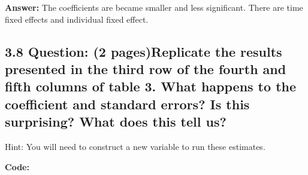 \documentclass[
]{article}
\begin{document}
\textbf{Answer:} The coefficients are became smaller and less
significant. There are time fixed effects and individual fixed effect.

\clearpage

\hypertarget{question-2-pagesreplicate-the-results-presented-in-the-third-row-of-the-fourth-and-fifth-columns-of-table-3.-what-happens-to-the-coefficient-and-standard-errors-is-this-surprising-what-does-this-tell-us}{%
\subsection{\texorpdfstring{3.8 \textbf{Question: (2 pages)Replicate the
results presented in the third row of the fourth and fifth columns of
table 3. What happens to the coefficient and standard errors? Is this
surprising? What does this tell
us?}}{3.8 Question: (2 pages)Replicate the results presented in the third row of the fourth and fifth columns of table 3. What happens to the coefficient and standard errors? Is this surprising? What does this tell us?}}\label{question-2-pagesreplicate-the-results-presented-in-the-third-row-of-the-fourth-and-fifth-columns-of-table-3.-what-happens-to-the-coefficient-and-standard-errors-is-this-surprising-what-does-this-tell-us}}

Hint: You will need to construct a new variable to run these estimates.

\textbf{Code:}
\end{document}
